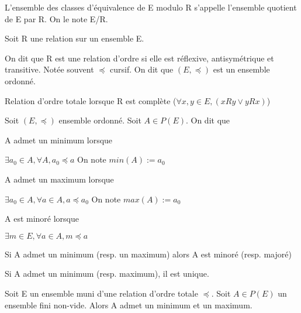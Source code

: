 \documentclass[a4paper, 12pt]{article}
\begin{document}
\begin{definition}
    L'ensemble des classes d'équivalence de E modulo R s'appelle l'ensemble quotient
    de E par R. On le note E/R.
\end{definition}

\begin{definition}
    Soit R une relation sur un ensemble E.

    On dit que R est une relation d'ordre si elle est réflexive, antisymétrique et transitive.
    Notée souvent $\preccurlyeq$ cursif. On dit que $(E, \preccurlyeq)$ est un ensemble ordonné.

    Relation d'ordre totale lorsque R est complète ($\forall x, y \in E, (xRy \lor yRx)$)
\end{definition}

\begin{definition}
    Soit $(E, \preccurlyeq)$ ensemble ordonné. Soit $A \in P(E)$. On dit que

    \item A admet un minimum lorsque
    
    $\exists a_0 \in A, \forall A, a_0 \preccurlyeq a$ On note $min(A) := a_0$

    \item A admet un maximum lorsque
    
    $\exists a_0 \in A, \forall a \in A, a \preccurlyeq a_0$ On note $max(A) := a_0$

    \item A est minoré lorsque
    
    $\exists m \in E, \forall a \in A, m \preccurlyeq a$

\end{definition}

\begin{remark}
    Si A admet un minimum (resp. un maximum) alors A est minoré (resp. majoré)
\end{remark}

\begin{remark}
    Si A admet un minimum (resp. maximum), il est unique.
\end{remark}

\begin{proposition}
    Soit E un ensemble muni d'une relation d'ordre totale $\preccurlyeq$.
    Soit $A \in P(E)$ un ensemble fini non-vide. Alors A admet un minimum et un maximum.
\end{proposition}


\end{document}
